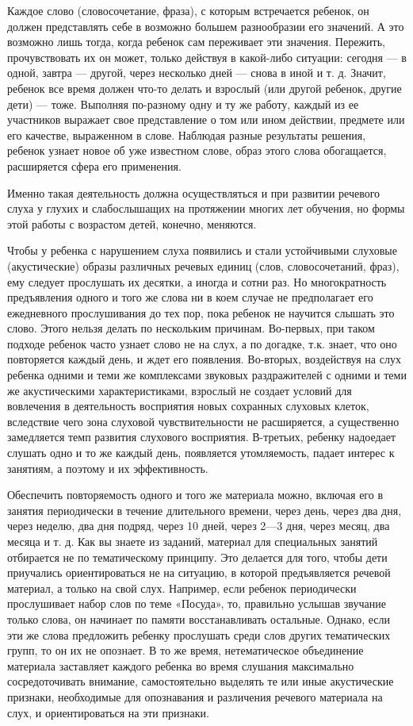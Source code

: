 \documentclass{book}
\begin{document}
Каждое слово (словосочетание, фраза), с которым встречается ребенок, он
должен представлять себе в возможно большем разнообразии его значений. А
это возможно лишь тогда, когда ребенок сам переживает эти значения.
Пережить, прочувствовать их он может, только действуя в какой-либо
ситуации: сегодня --- в одной, завтра --- другой, через несколько дней
--- снова в иной и т. д. Значит, ребенок все время должен что-то делать
и взрослый (или другой ребенок, другие дети) --- тоже. Выполняя
по-разному одну и ту же работу, каждый из ее участников выражает свое
представление о том или ином действии, предмете или его качестве,
выраженном в слове. Наблюдая разные результаты решения, ребенок узнает
новое об уже известном слове, образ этого слова обогащается, расширяется
сфера его применения.

Именно такая деятельность должна осуществляться и при развитии речевого
слуха у глухих и слабослышащих на протяжении многих лет обучения, но
формы этой работы с возрастом детей, конечно, меняются.

Чтобы у ребенка с нарушением слуха появились и стали устойчивыми
слуховые (акустические) образы различных речевых единиц (слов,
словосочетаний, фраз), ему следует прослушать их десятки, а иногда и
сотни раз. Но многократность предъявления одного и того же слова ни в
коем случае не предполагает его ежедневного прослушивания до тех пор,
пока ребенок не научится слышать это слово. Этого нельзя делать по
нескольким причинам. Во-первых, при таком подходе ребенок часто узнает
слово не на слух, а по догадке, т.к. знает, что оно повторяется каждый
день, и ждет его появления. Во-вторых, воздействуя на слух ребенка
одними и теми же комплексами звуковых раздражителей с одними и теми же
акустическими характеристиками, взрослый не создает условий для
вовлечения в деятельность восприятия новых сохранных слуховых клеток,
вследствие чего зона слуховой чувствительности не расширяется, а
существенно замедляется темп развития слухового восприятия. В-третьих,
ребенку надоедает слушать одно и то же каждый день, появляется
утомляемость, падает интерес к занятиям, а поэтому и их эффективность.

Обеспечить повторяемость одного и того же материала можно, включая его в
занятия периодически в течение длительного времени, через день, через
два дня, через неделю, два дня подряд, через 10 дней, через 2---3 дня,
через месяц, два месяца и т. д. Как вы знаете из заданий, материал для
специальных занятий отбирается не по тематическому принципу. Это
делается для того, чтобы дети приучались ориентироваться не на ситуацию,
в которой предъявляется речевой материал, а только на свой слух.
Например, если ребенок периодически прослушивает набор слов по теме
«Посуда», то, правильно услышав звучание только слова, он начинает по
памяти восстанавливать остальные. Однако, если эти же слова предложить
ребенку прослушать среди слов других тематических групп, то он их не
опознает. В то же время, нетематическое объединение материала заставляет
каждого ребенка во время слушания максимально сосредоточивать внимание,
самостоятельно выделять те или иные акустические признаки, необходимые
для опознавания и различения речевого материала на слух, и
ориентироваться на эти признаки.
\end{document}
